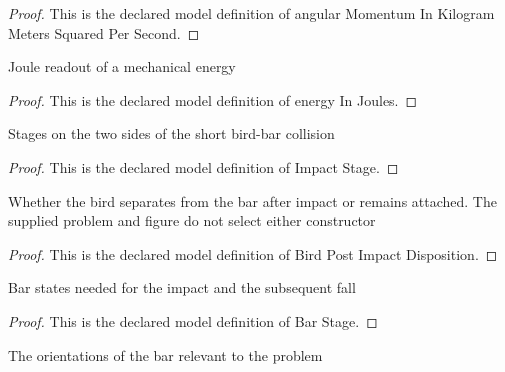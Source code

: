 \begin{proof}
  This is the declared model definition of angular Momentum In Kilogram Meters Squared Per Second.
\end{proof}
\begin{definition}
  \label{def:physics:phyx-mini-0790:phyxminiproblems-problemphyxmini0790-energyinjoules}
  Joule readout of a mechanical energy
\end{definition}
\begin{proof}
  This is the declared model definition of energy In Joules.
\end{proof}
\begin{definition}
  \label{def:physics:phyx-mini-0790:phyxminiproblems-problemphyxmini0790-impactstage}
  Stages on the two sides of the short bird-bar collision
\end{definition}
\begin{proof}
  This is the declared model definition of Impact Stage.
\end{proof}
\begin{definition}
  \label{def:physics:phyx-mini-0790:phyxminiproblems-problemphyxmini0790-birdpostimpactdisposition}
  Whether the bird separates from the bar after impact or remains attached. The supplied problem and figure do not select either constructor
\end{definition}
\begin{proof}
  This is the declared model definition of Bird Post Impact Disposition.
\end{proof}
\begin{definition}
  \label{def:physics:phyx-mini-0790:phyxminiproblems-problemphyxmini0790-barstage}
  Bar states needed for the impact and the subsequent fall
\end{definition}
\begin{proof}
  This is the declared model definition of Bar Stage.
\end{proof}
\begin{definition}
  \label{def:physics:phyx-mini-0790:phyxminiproblems-problemphyxmini0790-barorientation}
  The orientations of the bar relevant to the problem
\end{definition}
